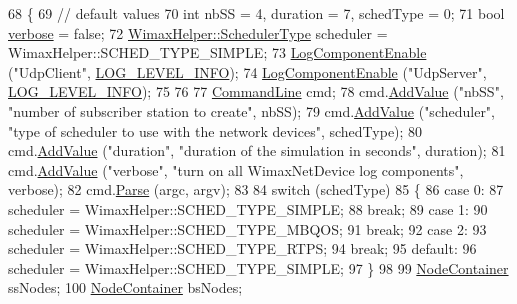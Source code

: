 \begin{DoxyCode}
68 \{
69   \textcolor{comment}{// default values}
70   \textcolor{keywordtype}{int} nbSS = 4, duration = 7, schedType = 0;
71   \textcolor{keywordtype}{bool} \hyperlink{openflow-switch_8cc_ab3f078684998b83967d507d0f453f454}{verbose} = \textcolor{keyword}{false};
72   \hyperlink{classns3_1_1WimaxHelper_a27a40a8f601900126156781c2ca79406}{WimaxHelper::SchedulerType} scheduler = WimaxHelper::SCHED\_TYPE\_SIMPLE;
73   \hyperlink{namespacens3_adc4ef4f00bb2f5f4edae67fc3bc27f20}{LogComponentEnable} (\textcolor{stringliteral}{"UdpClient"}, \hyperlink{namespacens3_aa6464a4d69551a9cc968e17a65f39bdbae36aedc880de94fd5a5b53bb9fe65628}{LOG\_LEVEL\_INFO});
74   \hyperlink{namespacens3_adc4ef4f00bb2f5f4edae67fc3bc27f20}{LogComponentEnable} (\textcolor{stringliteral}{"UdpServer"}, \hyperlink{namespacens3_aa6464a4d69551a9cc968e17a65f39bdbae36aedc880de94fd5a5b53bb9fe65628}{LOG\_LEVEL\_INFO});
75 
76 
77   \hyperlink{classns3_1_1CommandLine}{CommandLine} cmd;
78   cmd.\hyperlink{classns3_1_1CommandLine_addcfb546c7ad4c8bd0965654d55beb8e}{AddValue} (\textcolor{stringliteral}{"nbSS"}, \textcolor{stringliteral}{"number of subscriber station to create"}, nbSS);
79   cmd.\hyperlink{classns3_1_1CommandLine_addcfb546c7ad4c8bd0965654d55beb8e}{AddValue} (\textcolor{stringliteral}{"scheduler"}, \textcolor{stringliteral}{"type of scheduler to use with the network devices"}, schedType);
80   cmd.\hyperlink{classns3_1_1CommandLine_addcfb546c7ad4c8bd0965654d55beb8e}{AddValue} (\textcolor{stringliteral}{"duration"}, \textcolor{stringliteral}{"duration of the simulation in seconds"}, duration);
81   cmd.\hyperlink{classns3_1_1CommandLine_addcfb546c7ad4c8bd0965654d55beb8e}{AddValue} (\textcolor{stringliteral}{"verbose"}, \textcolor{stringliteral}{"turn on all WimaxNetDevice log components"}, verbose);
82   cmd.\hyperlink{classns3_1_1CommandLine_a5c10b85b3207e5ecb48d907966923156}{Parse} (argc, argv);
83 
84   \textcolor{keywordflow}{switch} (schedType)
85     \{
86     \textcolor{keywordflow}{case} 0:
87       scheduler = WimaxHelper::SCHED\_TYPE\_SIMPLE;
88       \textcolor{keywordflow}{break};
89     \textcolor{keywordflow}{case} 1:
90       scheduler = WimaxHelper::SCHED\_TYPE\_MBQOS;
91       \textcolor{keywordflow}{break};
92     \textcolor{keywordflow}{case} 2:
93       scheduler = WimaxHelper::SCHED\_TYPE\_RTPS;
94       \textcolor{keywordflow}{break};
95     \textcolor{keywordflow}{default}:
96       scheduler = WimaxHelper::SCHED\_TYPE\_SIMPLE;
97     \}
98 
99   \hyperlink{classns3_1_1NodeContainer}{NodeContainer} ssNodes;
100   \hyperlink{classns3_1_1NodeContainer}{NodeContainer} bsNodes;

\end{DoxyCode}
